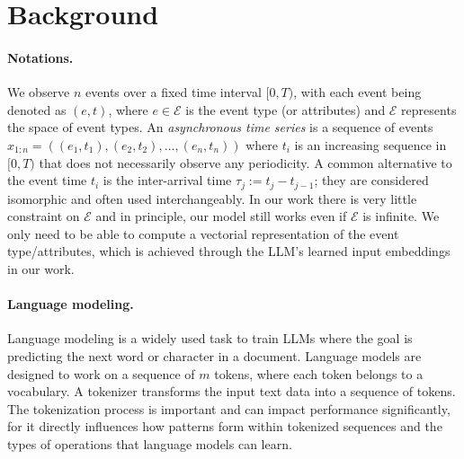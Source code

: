 
\section{Background} 

\paragraph{Notations.} 
We observe $n$ events over a fixed time interval $[0, T)$, with each event being denoted as $(e, t)$, where $e \in \mathcal{E}$ is the event type (or attributes) and $\mathcal{E}$ represents the space of event types. An \textit{asynchronous time series} is a sequence of events $x_{1:n} = ((e_1,t_1), (e_2, t_2), \ldots, (e_n, t_n))$ where $t_i$ is an increasing sequence in $[0, T)$ that does not necessarily observe any periodicity. A common alternative to the event time $t_i$ is the inter-arrival time $\tau_j:= t_j - t_{j-1}$; they are considered isomorphic and often used interchangeably. In our work there is very little constraint on $\mathcal{E}$ and in principle, our model still works even if $\mathcal{E}$ is infinite. We only need to be able to compute a vectorial representation of the event type/attributes, which is achieved through the LLM's learned input embeddings in our work.
\vspace{-0.1in}
\paragraph{Language modeling.} 
Language modeling is a widely used task to train LLMs where the goal is predicting the next word or character in a document. Language models are designed to work on a sequence of $m$ tokens, where each token belongs to a vocabulary. 
A tokenizer transforms the input text data into a sequence of tokens. The tokenization process is important and can impact performance significantly, for it directly influences how patterns form within tokenized sequences and the types of operations that language models can learn.


